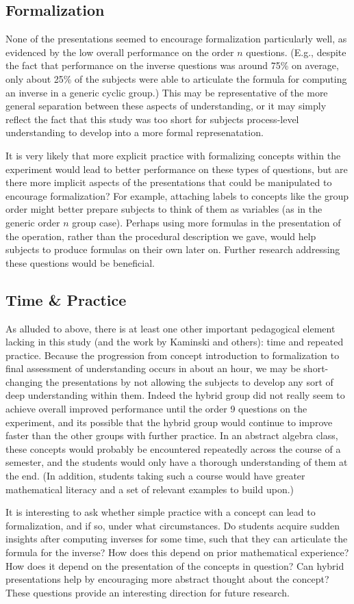 \documentclass[man,10pt]{apa6}
\begin{document}
\subsection{Formalization}
None of the presentations seemed to encourage formalization particularly well, as evidenced by the low overall performance on the order $n$ questions. (E.g., despite the fact that performance on the inverse questions was around 75\% on average, only about 25\% of the subjects were able to articulate the formula for computing an inverse in a generic cyclic group.) This may be representative of the more general separation between these aspects of understanding, or it may simply reflect the fact that this study was too short for subjects process-level understanding to develop into a more formal represenatation.  \par
It is very likely that more explicit practice with formalizing concepts within the experiment would lead to better performance on these types of questions, but are there more implicit aspects of the presentations that could be manipulated to encourage formalization? For example, attaching labels to concepts like the group order might better prepare subjects to think of them as variables (as in the generic order $n$ group case). Perhaps using more formulas in the presentation of the operation, rather than the procedural description we gave, would help subjects to produce formulas on their own later on. Further research addressing these questions would be beneficial.\par
\subsection{Time \& Practice}
As alluded to above, there is at least one other important pedagogical element lacking in this study (and the work by Kaminski and others): time and repeated practice. Because the progression from concept introduction to formalization to final assessment of understanding occurs in about an hour, we may be short-changing the presentations by not allowing the subjects to develop any sort of deep understanding within them. Indeed the hybrid group did not really seem to achieve overall improved performance until the order 9 questions on the experiment, and its possible that the hybrid group would continue to improve faster than the other groups with further practice. In an abstract algebra class, these concepts would probably be encountered repeatedly across the course of a semester, and the students would only have a thorough understanding of them at the end. (In addition, students taking such a course would have greater mathematical literacy and a set of relevant examples to build upon.)\par
It is interesting to ask whether simple practice with a concept can lead to formalization, and if so, under what circumstances. Do students acquire sudden insights after computing inverses for some time, such that they can articulate the formula for the inverse? How does this depend on prior mathematical experience? How does it depend on the presentation of the concepts in question? Can hybrid presentations help by encouraging more abstract thought about the concept? These questions provide an interesting direction for future research. 
\end{document}
